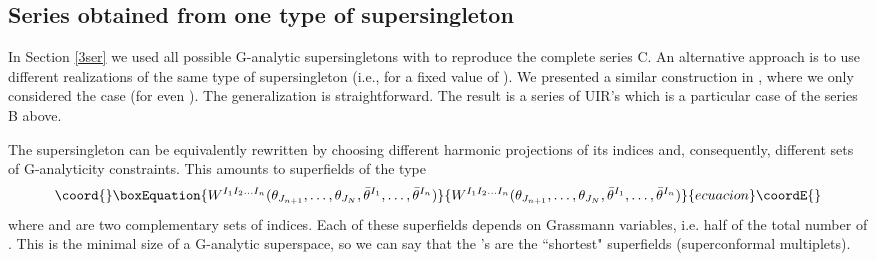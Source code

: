 \documentclass[a4paper,12pt]{article}
\begin{document}
\subsection{Series obtained from one type of supersingleton}

In Section \ref{3ser} we used all possible G-analytic 
supersingletons \coordHE{} with \coordHE{} to 
reproduce the complete series C. An alternative approach is to 
use different realizations of the same type of supersingleton 
(i.e., for a fixed value of \coordHE{}). We presented a similar 
construction in \cite{FS1}, where we only considered the case 
\coordHE{} (for even \coordHE{}). The generalization is straightforward. The 
result is a series of UIR's which is a particular case of the 
series B above. 

The supersingleton \coordHE{} can be equivalently rewritten 
by choosing different harmonic projections of its \coordHE{} 
indices and, consequently, different sets of G-analyticity 
constraints. This amounts to superfields of the type  
\begin{equation}\coord{}\boxEquation{\label{5.8}
  W^{I_1I_2\ldots I_n}
(\theta_{J_{n+1}},\ldots, \theta_{J_N}, 
\bar\theta^{I_1},\ldots,\bar\theta^{I_n}) 
}{W^{I_1I_2\ldots I_n}
(\theta_{J_{n+1}},\ldots, \theta_{J_N}, 
\bar\theta^{I_1},\ldots,\bar\theta^{I_n}) 
}{ecuacion}\coordE{}\end{equation}
where \coordHE{} and \coordHE{} are two 
complementary sets of \coordHE{} indices. Each of these superfields 
depends on \coordHE{} Grassmann variables, i.e. half of the total number 
of \coordHE{}. This is the minimal size of a G-analytic superspace, so 
we can say that the \coordHE{}'s are the ``shortest" superfields 
(superconformal multiplets). 
\end{document}
